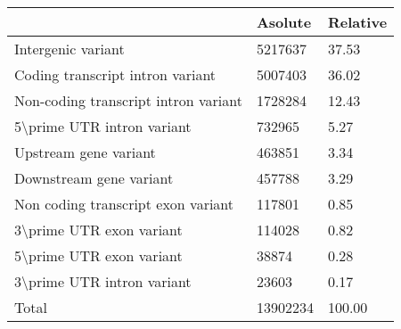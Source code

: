 \begin{tabular}{lll}
\toprule
{} &   Asolute &  Relative \\
\midrule
Intergenic variant                   &   5217637 &     37.53 \\
Coding transcript intron variant     &   5007403 &     36.02 \\
Non-coding transcript intron variant &   1728284 &     12.43 \\
5\textbackslash prime UTR intron variant           &    732965 &      5.27 \\
Upstream gene variant                &    463851 &      3.34 \\
Downstream gene variant              &    457788 &      3.29 \\
Non coding transcript exon variant   &    117801 &      0.85 \\
3\textbackslash prime UTR exon variant             &    114028 &      0.82 \\
5\textbackslash prime UTR exon variant             &     38874 &      0.28 \\
3\textbackslash prime UTR intron variant           &     23603 &      0.17 \\
Total                                &  13902234 &    100.00 \\
\bottomrule
\end{tabular}
